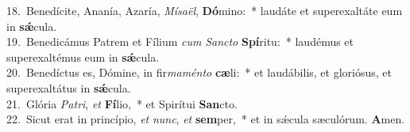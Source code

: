 {18.~}Benedícite, Ananía, Azaría, \textit{Mí}\textit{sa}\textit{ël}, \textbf{Dó}mino:~* laudáte et superexaltáte eum in \textbf{sǽ}cula.\\
{19.~}Benedicámus Patrem et Fílium \textit{cum} \textit{San}\textit{cto} \textbf{Spí}ritu:~* laudémus et superexaltémus eum in \textbf{sǽ}cula.\\
{20.~}Benedíctus es, Dómine, in fir\textit{ma}\textit{mén}\textit{to} \textbf{cæ}li:~* et laudábilis, et gloriósus, et superexaltátus in \textbf{sǽ}cula.\\
{21.~}Glória \textit{Pa}\textit{tri}, \textit{et} \textbf{Fí}lio,~* et Spirítui \textbf{San}cto.\\
{22.~}Sicut erat in princípio, \textit{et} \textit{nunc}, \textit{et} \textbf{sem}per,~* et in sǽcula sæculórum. \textbf{A}men.\\
